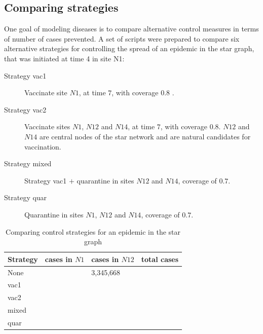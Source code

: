 \begin{description}
\subsection{Comparing strategies}
One goal of modeling diseases is to compare alternative control measures in terms of number of cases prevented. A set of scripts were prepared to compare six alternative strategies for controlling the spread of an epidemic in the star graph, that was initiated at time 4 in site N1:
\begin{description}
\item[Strategy vac1]  Vaccinate site $N1$, at time $7$, with coverage $0.8$ .
\item[Strategy vac2]  Vaccinate sites $N1$, $N12$ and $N14$, at time $7$, with coverage $0.8$. $N12$ and $N14$ are central nodes of the star network and are natural candidates for vaccination.
\item[Strategy mixed] Strategy vac1 $+$ quarantine in sites $N12$ and $N14$, coverage of $0.7$.
\item[Strategy quar] Quarantine in sites $N1$, $N12$ and $N14$, coverage of $0.7$.
\end{description}
\begin{table}
\begin{center}
 \caption{Comparing control strategies for an epidemic in the star graph}
\begin{tabular}{l l l l}
\hline
Strategy & cases in $N1$ & cases in $N12$& total cases \\
\hline
None & & 3,345,668 & \\
vac1 & & & \\
vac2 & & & \\
mixed & & & \\
quar & & &\\
\hline
\end{tabular}
\label{strats}
\end{center}
\end{table} 


\end{description}




